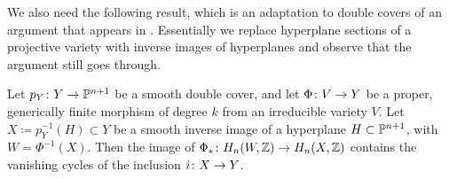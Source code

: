 We also need the following result, which is an adaptation to double covers of an argument that appears in \cite[Lemma 2.14]{BlochLectures}. Essentially we replace hyperplane sections of a projective variety with inverse images of hyperplanes and observe that the argument still goes through.

\begin{lemma}
\label{lem:BlochLemma}
  Let $p_Y \from Y \to \P^{n+1}$ be a smooth double cover, and let $\Phi \from V \to Y$ be a proper, generically finite morphism of degree $k$ from an irreducible variety $V$. Let $X \coloneqq p_Y^{-1}(H) \subset Y$ be a smooth inverse image of a hyperplane $H \subset \P^{n+1}$, with $W = \Phi^{-1}(X)$. Then the image of $\Phi_* \from H_n(W,\Z) \to H_n(X,\Z)$ contains the vanishing cycles of the inclusion $i \from X \to Y$.
\end{lemma}
